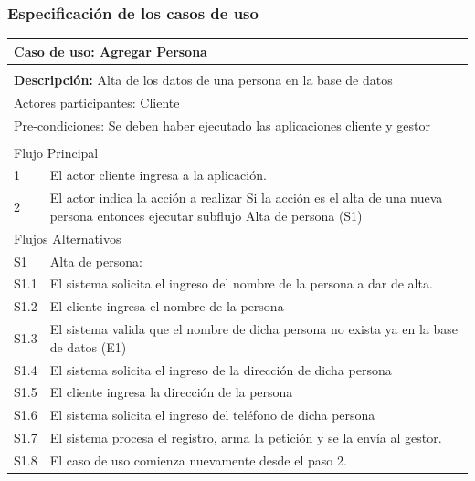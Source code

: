 \documentclass[11pt]{article}
\begin{document}
\subsubsection{Especificaci\'on de los casos de uso}
  \begin{tabular}{|l|m{}|}
    \hline
    \multicolumn{2}{|m{0.9\textwidth}|}{{\bf Caso de uso: Agregar Persona}} \\
    \hline
    \multicolumn{2}{|l|}{\rowcolor[gray]{.5}} \\
    \hline
  
    \multicolumn{2}{|p{0.9\textwidth}|}{{\bf Descripción:} Alta de los datos de una 
    persona en la base de datos } \\
  
    \hline
    \multicolumn{2}{|l|}{Actores participantes: Cliente} \\
    \hline
  
    \multicolumn{2}{|l|}{Pre-condiciones: Se deben haber ejecutado las aplicaciones cliente 
    y gestor} \\
  
    \hline
    \multicolumn{2}{|l|}{\rowcolor[gray]{.5}} \\
    \hline
    \multicolumn{2}{|l|}{Flujo Principal} \\
    \hline
    1 & El actor cliente ingresa a la aplicaci\'on. \\
    \hline
    2 &  El actor indica la acción a realizar \newline
    Si la acción es el alta de una nueva persona entonces ejecutar subflujo Alta de persona (S1)\newline
   \\
    
    \hline
    \multicolumn{2}{|l|}{Flujos Alternativos} \\
    \hline
  
    S1 &  Alta de persona: \\ \hline
    S1.1 & El sistema solicita el ingreso del nombre de la persona a dar de alta.\\ \hline
    S1.2 & El cliente ingresa el nombre de la persona\\ \hline
    S1.3 & El sistema valida que el nombre de dicha persona no exista ya en la base de datos (E1) \\ \hline
    S1.4 & El sistema solicita el ingreso de la direcci\'on de dicha persona\\ \hline
    S1.5 & El cliente ingresa la direcci\'on de la persona\\ \hline
    S1.6 & El sistema solicita el ingreso del tel\'efono de dicha persona\\ \hline
    S1.7 & El sistema procesa el registro, arma la petici\'on y se la env\'ia al gestor.\\ \hline
    S1.8 & El caso de uso comienza nuevamente desde el paso 2.\\ \hline
    

\end{tabular}
\end{document}

